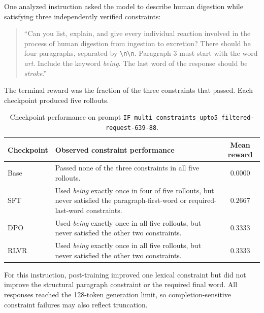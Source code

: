 One analyzed instruction asked the model to describe human digestion while
satisfying three independently verified constraints:

\begin{quote}
\small
``Can you list, explain, and give every individual reaction involved in the
process of human digestion from ingestion to excretion? There should be four
paragraphs, separated by \texttt{\textbackslash n\textbackslash n}. Paragraph 3
must start with the word \emph{art}. Include the keyword \emph{being}. The last
word of the response should be \emph{stroke}.''
\end{quote}

The terminal reward was the fraction of the three constraints that passed.
Each checkpoint produced five rollouts.

\begin{table}[ht]
\centering
\small
\begin{tabular}{l p{8.7cm} c}
\hline
Checkpoint & Observed constraint performance & Mean reward \\
\hline
Base & Passed none of the three constraints in all five rollouts. & $0.0000$ \\
SFT & Used \emph{being} exactly once in four of five rollouts, but never
satisfied the paragraph-first-word or required-last-word constraints. & $0.2667$ \\
DPO & Used \emph{being} exactly once in all five rollouts, but never satisfied
the other two constraints. & $0.3333$ \\
RLVR & Used \emph{being} exactly once in all five rollouts, but never satisfied
the other two constraints. & $0.3333$ \\
\hline
\end{tabular}
\caption{Checkpoint performance on prompt
\texttt{IF\_multi\_constraints\_upto5\_filtered-request-639-88}.}
\label{tab:checkpoint-prompt-example}
\end{table}

For this instruction, post-training improved one lexical constraint but did not
improve the structural paragraph constraint or the required final word. All
responses reached the 128-token generation limit, so completion-sensitive
constraint failures may also reflect truncation.


